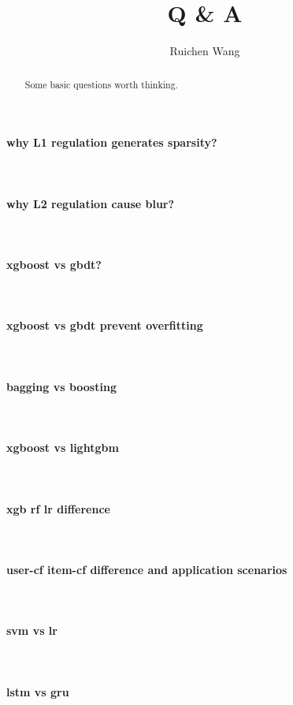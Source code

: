 \documentclass{article}
\author{Ruichen Wang}
\title{Q \& A}
\begin{document}
\maketitle
\begin{abstract}
Some basic questions worth thinking.
\end{abstract}
\noindent
\paragraph{why L1 regulation generates sparsity?}~{}
\paragraph{why L2 regulation cause blur?}~{}
\paragraph{xgboost vs gbdt?}~{}
\paragraph{xgboost vs gbdt prevent overfitting}~{}
\paragraph{bagging vs boosting}~{}
\paragraph{xgboost vs lightgbm}~{}
\paragraph{xgb rf lr difference}~{}
\paragraph{user-cf item-cf difference and application scenarios}~{}
\paragraph{svm vs lr}~{}
\paragraph{lstm vs gru}~{}
\end{document}
